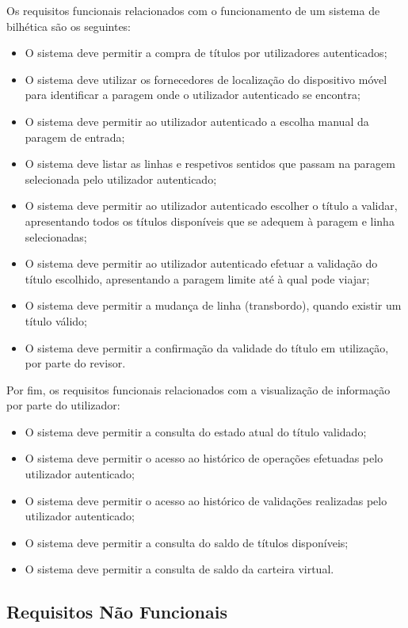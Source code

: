Os requisitos funcionais relacionados com o funcionamento de um sistema de bilhética são os seguintes:
\begin{itemize}
\item O sistema deve permitir a compra de títulos por utilizadores autenticados;
\item O sistema deve utilizar os fornecedores de localização do dispositivo móvel para identificar a paragem onde o utilizador autenticado se encontra;
\item O sistema deve permitir ao utilizador autenticado a escolha manual da paragem de entrada;
\item O sistema deve listar as linhas e respetivos sentidos que passam na paragem selecionada pelo utilizador autenticado;
\item O sistema deve permitir ao utilizador autenticado escolher o título a validar, apresentando todos os títulos disponíveis que se adequem à paragem e linha selecionadas;
\item O sistema deve permitir ao utilizador autenticado efetuar a validação do título escolhido, apresentando a paragem limite até à qual pode viajar;
\item O sistema deve permitir a mudança de linha (transbordo), quando existir um título válido;
\item O sistema deve permitir a confirmação da validade do título em utilização, por parte do revisor.
\end{itemize}

Por fim, os requisitos funcionais relacionados com a visualização de informação por parte do utilizador:
\begin{itemize}
\item O sistema deve permitir a consulta do estado atual do título validado;
\item O sistema deve permitir o acesso ao histórico de operações efetuadas pelo utilizador autenticado;
\item O sistema deve permitir o acesso ao histórico de validações realizadas pelo utilizador autenticado;
\item O sistema deve permitir a consulta do saldo de títulos disponíveis;
\item O sistema deve permitir a consulta de saldo da carteira virtual.
\end{itemize}

\subsection{Requisitos Não Funcionais}


